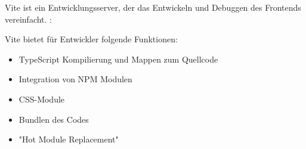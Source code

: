 

Vite ist ein Entwicklungsserver, der das Entwickeln und Debuggen des Frontends vereinfacht. \cite{ViteOverview}:

Vite bietet für Entwickler folgende Funktionen:

\begin{itemize}
    \item TypeScript Kompilierung und Mappen zum Quellcode
    \item Integration von NPM Modulen
    \item CSS-Module
    \item Bundlen des Codes
    \item "Hot Module Replacement"
\end{itemize}



